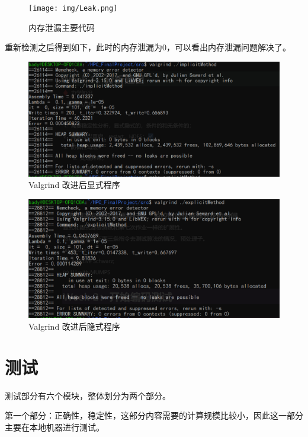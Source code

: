 \documentclass[10pt, a4paper]{article}
\begin{document}
\begin{figure}[!h]
\centering
\texttt{[image: img/Leak.png]}
\caption{内存泄漏主要代码}
\label{fig:1}
\end{figure}

重新检测之后得到如下，此时的内存泄漏为0，可以看出内存泄漏问题解决了。

\begin{figure}[!h]
\centering
\includegraphics[scale=0.33]{img/Valgrind-after.png}
\caption{Valgrind 改进后显式程序}
\label{fig:1}
\end{figure}
\begin{figure}[!h]
\centering
\includegraphics[scale=0.35]{img/Valgrind-after2.png}
\caption{Valgrind 改进后隐式程序}
\label{fig:1}
\end{figure}


\clearpage
\section{测试}
测试部分有六个模块，整体划分为两个部分。

第一个部分：正确性，稳定性，这部分内容需要的计算规模比较小，因此这一部分主要在本地机器进行测试。
\end{document}
